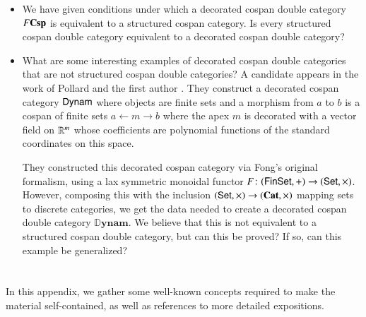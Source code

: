 \documentclass[reqno]{amsart}
\begin{document}
\begin{itemize}
\item We have given conditions under which a decorated cospan double category $F \mathbf{Csp}$ is
equivalent to a structured cospan category.    Is every structured cospan double category 
equivalent to a decorated cospan double category?
\item What are some interesting examples of decorated cospan double categories that are not structured cospan double categories?   A candidate appears in the work of Pollard and the first author \cite{BP}.  They construct a decorated cospan category $\mathsf{Dynam}$ where objects are finite sets and a morphism from $a$ to $b$ is a cospan of finite sets $a \leftarrow m \rightarrow b$ where the apex $m$ is decorated with a vector field on $\mathbb{R}^m$ whose coefficients are polynomial functions of the standard coordinates on this space.

They constructed this decorated cospan category via Fong's original formalism, using a lax symmetric monoidal functor $F \colon (\mathsf{Fin}\mathsf{Set}, +) \to (\mathsf{Set}, \times)$.  However, composing this with the inclusion $(\mathsf{Set}, \times) \to (\mathbf{Cat}, \times)$ mapping sets to discrete categories, we get the data needed to create a decorated cospan double category $\mathbb{D}\mathbf{ynam}$.   We believe that this is not equivalent to a structured cospan double category, but can this be proved?  If so, can this example be generalized?
\end{itemize}

\appendix

\section{}
In this appendix, we gather some well-known concepts required to make the material self-contained, as well as references to more detailed expositions.
\end{document}
